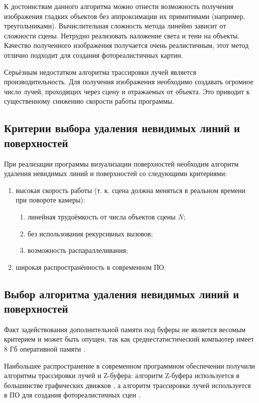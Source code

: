 
К достоинствам данного алгоритма можно отнести возможность получения изображения гладких объектов без аппроксимации их примитивами (например, треугольниками).
Вычислительная сложность метода линейно зависит от сложности сцены.
Нетрудно реализовать наложение света и тени на объекты.
Качество полученного изображения получается очень реалистичным, этот метод отлично подходит для создания фотореалистичных картин.

Серьёзным недостатком алгоритма трассировки лучей является производительность.
Для получения изображения необходимо создавать огромное число лучей, проходящих через сцену и отражаемых от объекта.
Это приводит к существенному снижению скорости работы программы.

\subsection{Критерии выбора удаления невидимых линий и поверхностей}

При реализации программы визуализации поверхностей необходим алгоритм удаления невидимых линий и поверхностей со следующими критериями:
\begin{enumerate}
	\item высокая скорость работы (т. к. сцена должна меняться в реальном времени при повороте камеры): \begin{enumerate}
		\item линейная трудоёмкость от числа объектов сцены $N$;
		\item без использования рекурсивных вызовов;
		\item возможность распараллеливания;
	\end{enumerate}

	\item широкая распространённость в современном ПО.
\end{enumerate}

\subsection{Выбор алгоритма удаления невидимых линий и поверхностей}

Факт задействования дополнительной памяти под буферы не является весомым критерием и может быть опущен, так как среднестатистический компьютер имеет 8 Гб оперативной памяти \cite{steam}.

Наибольшее распространение в современном программном обеспечении получили алгоритмы трассировки лучей и Z-буфера: алгоритм Z-буфера используется в большинстве графических движков \cite{opengl}\cite{directx}, а алгоритм трассировки лучей используется в ПО для создания фотореалистичных сцен \cite{nvidia}.

